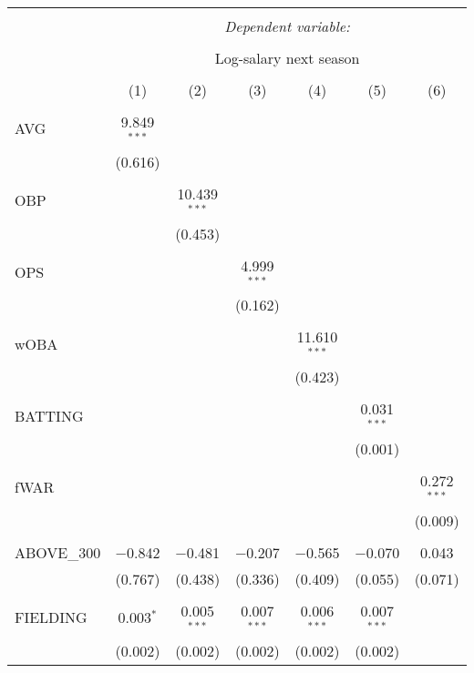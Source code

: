 
\begin{table}[!htbp] \centering
  \caption{}
  \label{}
  \scriptsize
\begin{tabular}{@{\extracolsep{5pt}}lcccccc}
\\[-1.8ex]\hline
\hline \\[-1.8ex]
 & \multicolumn{6}{c}{\textit{Dependent variable:}} \\
\cline{2-7}
\\[-1.8ex] & \multicolumn{6}{c}{Log-salary next season} \\
\\[-1.8ex] & (1) & (2) & (3) & (4) & (5) & (6)\\
\hline \\[-1.8ex]
 AVG & 9.849$^{***}$ &  &  &  &  &  \\
  & (0.616) &  &  &  &  &  \\
  & & & & & & \\
 OBP &  & 10.439$^{***}$ &  &  &  &  \\
  &  & (0.453) &  &  &  &  \\
  & & & & & & \\
 OPS &  &  & 4.999$^{***}$ &  &  &  \\
  &  &  & (0.162) &  &  &  \\
  & & & & & & \\
 wOBA &  &  &  & 11.610$^{***}$ &  &  \\
  &  &  &  & (0.423) &  &  \\
  & & & & & & \\
 BATTING &  &  &  &  & 0.031$^{***}$ &  \\
  &  &  &  &  & (0.001) &  \\
  & & & & & & \\
 fWAR &  &  &  &  &  & 0.272$^{***}$ \\
  &  &  &  &  &  & (0.009) \\
  & & & & & & \\
 ABOVE\_300 & $-$0.842 & $-$0.481 & $-$0.207 & $-$0.565 & $-$0.070 & 0.043 \\
  & (0.767) & (0.438) & (0.336) & (0.409) & (0.055) & (0.071) \\
  & & & & & & \\
 FIELDING & 0.003$^{*}$ & 0.005$^{***}$ & 0.007$^{***}$ & 0.006$^{***}$ & 0.007$^{***}$ &  \\
  & (0.002) & (0.002) & (0.002) & (0.002) & (0.002) &  \\

\end{tabular}
\end{table}
